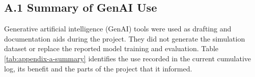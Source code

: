 \providecommand{\PortfolioImportedPageCommand}{}

{}
\subsection*{A.1 Summary of GenAI Use}
\label{app:a-summary}

Generative artificial intelligence (GenAI) tools were used as drafting and
documentation aids during the project. They did not generate the simulation
dataset or replace the reported model training and evaluation. Table~
\ref{tab:appendix-a-summary} identifies the use recorded in the current
cumulative log, its benefit and the parts of the project that it informed.

